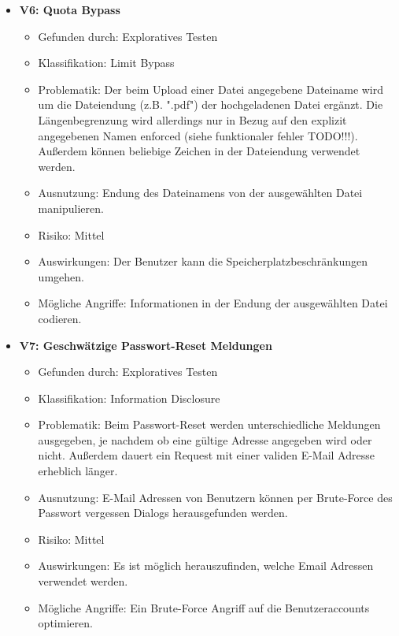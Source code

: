 \documentclass[12pt,DIV14,BCOR10mm,a4paper,parskip=half-,headsepline,headinclude,english,ngerman,bibliography=totocnumbered]{scrreprt}
\begin{document}
\begin{itemize}
  \hypertarget{vulnerability6}{}
  \item \textbf{V6: Quota Bypass}
  \begin{itemize}
    \item Gefunden durch: Exploratives Testen
  \item Klassifikation: Limit Bypass
  \item Problematik: Der beim Upload einer Datei angegebene Dateiname wird um die Dateiendung (z.B. ".pdf") der hochgeladenen Datei ergänzt. Die Längenbegrenzung wird allerdings nur in Bezug auf den explizit angegebenen Namen enforced (siehe funktionaler fehler TODO!!!). Außerdem können beliebige Zeichen in der Dateiendung verwendet werden.
  \item Ausnutzung: Endung des Dateinamens von der ausgewählten Datei manipulieren.
  \item Risiko: Mittel
  \item Auswirkungen: Der Benutzer kann die Speicherplatzbeschränkungen umgehen.
  \item Mögliche Angriffe: Informationen in der Endung der ausgewählten Datei codieren.
  \end{itemize}

  \hypertarget{vulnerability7}{}
  \item \textbf{V7: Geschwätzige Passwort-Reset Meldungen}
  \begin{itemize}
  \item Gefunden durch: Exploratives Testen
  \item Klassifikation: Information Disclosure
  \item Problematik: Beim Passwort-Reset werden unterschiedliche Meldungen ausgegeben, je nachdem ob eine gültige Adresse angegeben wird oder nicht. Außerdem dauert ein Request mit einer validen E-Mail Adresse erheblich länger.
  \item Ausnutzung: E-Mail Adressen von Benutzern können per Brute-Force des Passwort vergessen Dialogs herausgefunden werden. 
  \item Risiko: Mittel
  \item Auswirkungen: Es ist möglich herauszufinden, welche Email Adressen verwendet werden.
  \item Mögliche Angriffe: Ein Brute-Force Angriff auf die Benutzeraccounts optimieren.
  \end{itemize}


\end{itemize}
\end{document}
